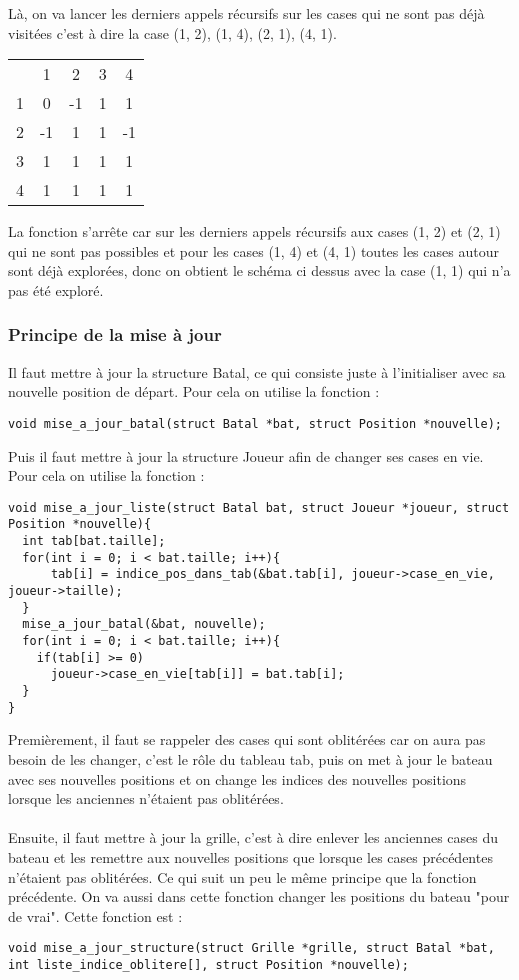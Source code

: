 Là, on va lancer les derniers appels récursifs sur les cases qui ne sont pas déjà visitées c'est à dire la case (1, 2), (1, 4), (2, 1), (4, 1). \\ 
\begin{center}
\begin{tabular}{c|c|c|c|c|}
\multicolumn{1}{c}{} & \multicolumn{1}{c}{1} & \multicolumn{1}{c}{2} & \multicolumn{1}{c}{3} & \multicolumn{1}{c}{4}\\
\cline{2-5} 1 & 0 & \cellcolor{red}-1 & 1 & 1\\
\cline{2-5} 2 & \cellcolor{red}-1 & 1 & 1 & \cellcolor{red}-1\\
\cline{2-5} 3 & 1 & 1 & 1 & 1\\
\cline{2-5} 4 & 1 & 1 & 1 & 1\\
\cline{2-5}
\end{tabular}
\end{center}
La fonction s'arrête car sur les derniers appels récursifs aux cases (1, 2) et (2, 1) qui ne sont pas possibles et pour les cases (1, 4) et (4, 1) toutes les cases autour sont déjà explorées, donc on obtient le schéma ci dessus avec la case (1, 1) qui n'a pas été exploré.
\subsubsection{Principe de la mise à jour}
Il faut mettre à jour la structure Batal, ce qui consiste juste à l'initialiser avec sa nouvelle position de départ. Pour cela on utilise la fonction :
\begin{lstlisting}
void mise_a_jour_batal(struct Batal *bat, struct Position *nouvelle);
\end{lstlisting}
Puis il faut mettre à jour la structure Joueur afin de changer ses cases en vie.
Pour cela on utilise la fonction :
\begin{lstlisting}
void mise_a_jour_liste(struct Batal bat, struct Joueur *joueur, struct Position *nouvelle){
  int tab[bat.taille];
  for(int i = 0; i < bat.taille; i++){
      tab[i] = indice_pos_dans_tab(&bat.tab[i], joueur->case_en_vie, joueur->taille);
  }
  mise_a_jour_batal(&bat, nouvelle);
  for(int i = 0; i < bat.taille; i++){
    if(tab[i] >= 0)
      joueur->case_en_vie[tab[i]] = bat.tab[i];
  }
}
\end{lstlisting}
Premièrement, il faut se rappeler des cases qui sont oblitérées car on aura pas besoin de les changer, c'est le rôle du tableau tab, puis on met à jour le bateau avec ses nouvelles positions et on change les indices des nouvelles positions lorsque les anciennes n'étaient pas oblitérées.\\
\\
Ensuite, il faut mettre à jour la grille, c'est à dire enlever les anciennes cases du bateau et les remettre aux nouvelles positions que lorsque les cases précédentes n'étaient pas oblitérées. Ce qui suit un peu le même principe que la fonction précédente. On va aussi dans cette fonction changer les positions du bateau "pour de vrai". Cette fonction est :
\begin{lstlisting}
void mise_a_jour_structure(struct Grille *grille, struct Batal *bat, int liste_indice_oblitere[], struct Position *nouvelle);
\end{lstlisting}
